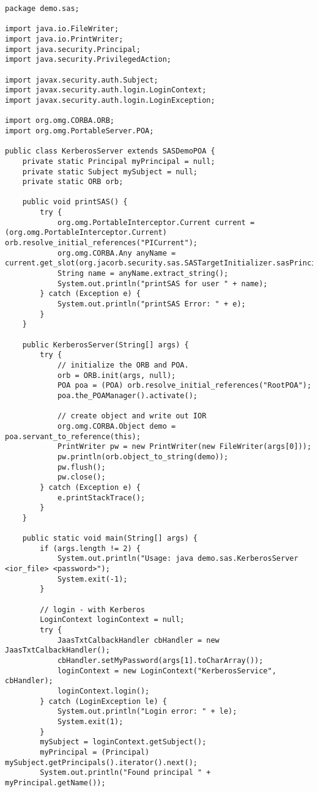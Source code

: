 \begin{scriptsize}
\begin{verbatim}
package demo.sas;

import java.io.FileWriter;
import java.io.PrintWriter;
import java.security.Principal;
import java.security.PrivilegedAction;

import javax.security.auth.Subject;
import javax.security.auth.login.LoginContext;
import javax.security.auth.login.LoginException;

import org.omg.CORBA.ORB;
import org.omg.PortableServer.POA;

public class KerberosServer extends SASDemoPOA {
    private static Principal myPrincipal = null; 
    private static Subject mySubject = null;	
    private static ORB orb;

    public void printSAS() {
        try {
            org.omg.PortableInterceptor.Current current = (org.omg.PortableInterceptor.Current)      orb.resolve_initial_references("PICurrent");
            org.omg.CORBA.Any anyName = current.get_slot(org.jacorb.security.sas.SASTargetInitializer.sasPrincipalNamePIC);
            String name = anyName.extract_string();
            System.out.println("printSAS for user " + name);
        } catch (Exception e) {
            System.out.println("printSAS Error: " + e);
        }
    }
	
    public KerberosServer(String[] args) {
        try {
            // initialize the ORB and POA.
            orb = ORB.init(args, null);
            POA poa = (POA) orb.resolve_initial_references("RootPOA");
            poa.the_POAManager().activate();
			
            // create object and write out IOR
            org.omg.CORBA.Object demo = poa.servant_to_reference(this);
            PrintWriter pw = new PrintWriter(new FileWriter(args[0]));
            pw.println(orb.object_to_string(demo));
            pw.flush();
            pw.close();
        } catch (Exception e) {
            e.printStackTrace();
        }
    }

    public static void main(String[] args) {
        if (args.length != 2) {
            System.out.println("Usage: java demo.sas.KerberosServer <ior_file> <password>");
            System.exit(-1);
        }

        // login - with Kerberos
        LoginContext loginContext = null;
        try {
            JaasTxtCalbackHandler cbHandler = new JaasTxtCalbackHandler();
            cbHandler.setMyPassword(args[1].toCharArray());
            loginContext = new LoginContext("KerberosService", cbHandler);
            loginContext.login();
        } catch (LoginException le) {
            System.out.println("Login error: " + le);
            System.exit(1);
        }
        mySubject = loginContext.getSubject();
        myPrincipal = (Principal) mySubject.getPrincipals().iterator().next();
        System.out.println("Found principal " + myPrincipal.getName());


\end{verbatim}
\end{scriptsize}
